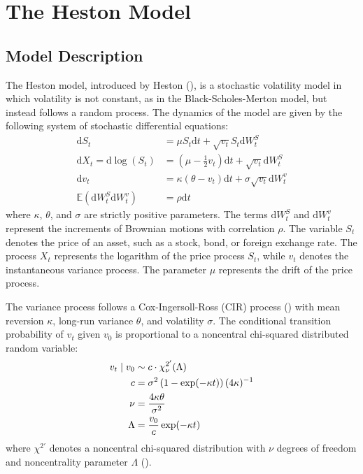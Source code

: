\section{The Heston Model}
\label{sec:heston_model}

\subsection{Model Description}

The Heston model, introduced by Heston (\citeyear{hestonClosedFormSolutionOptions1993}), is a stochastic volatility model in which volatility is not constant, as in the Black-Scholes-Merton model, but instead follows a random process. The dynamics of the model are given by the following system of stochastic differential equations:
\begin{align}
    \label{eq:heston_model_price}
    \mathrm{d}S_t &= \mu S_t\mathrm{d}t + \sqrt{v_t}S_t\mathrm{d}W_t^S \\
    \label{eq:heston_model_log_price}
    \mathrm{d}X_t = \mathrm{d}\log(S_t) &= \left(\mu-\frac{1}{2}v_t\right)\mathrm{d}t + \sqrt{v_t}\mathrm{d}W_t^S \\
    \label{eq:heston_model_variance}
    \mathrm{d}v_t &= \kappa(\theta-v_t)\mathrm{d}t + \sigma\sqrt{v_t}\mathrm{d}W_t^v \\
    \label{eq:heston_model_correlation}
    \mathbb{E}(\mathrm{d}W_t^S\mathrm{d}W_t^v) &= \rho\mathrm{d}t
\end{align}
where $\kappa$, $\theta$, and $\sigma$ are strictly positive parameters. The terms $\mathrm{d}W_t^S$ and $\mathrm{d}W_t^v$ represent the increments of Brownian motions with correlation $\rho$. The variable $S_t$ denotes the price of an asset, such as a stock, bond, or foreign exchange rate. The process $X_t$ represents the logarithm of the price process $S_t$, while $v_t$ denotes the instantaneous variance process. The parameter $\mu$ represents the drift of the price process.

The variance process follows a Cox-Ingersoll-Ross (CIR) process (\cite{coxTheoryTermStructure1985}) with mean reversion $\kappa$, long-run variance $\theta$, and volatility $\sigma$. The conditional transition probability of $v_t$ given $v_0$ is proportional to a noncentral chi-squared distributed random variable:
\begin{align}
    \label{eq:heston_model_variance_transition}
    v_t\mid v_0 &\sim c\cdot \chi^{2'}_{\nu}(\Lambda) \\
    c &= \sigma^2\left(1 - \exp(-\kappa t)\right)(4\kappa)^{-1} \notag \\
    \nu &= \frac{4\kappa\theta}{\sigma^2} \notag \\
    \Lambda &= \frac{v_0}{c}\exp(-\kappa t) \notag
\end{align}
where $\chi^{2'}$ denotes a noncentral chi-squared distribution with $\nu$ degrees of freedom and noncentrality parameter $\Lambda$ (\cite{okhrinSimulatingCoxIngersoll2022}).

